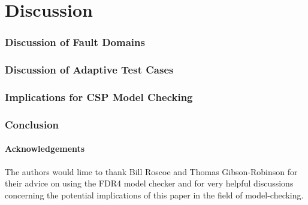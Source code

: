 \section{Discussion}
\label{sec:conc}
\subsubsection*{Discussion of Fault Domains}

\subsubsection*{Discussion of Adaptive Test Cases}

\subsubsection*{Implications for CSP Model Checking}

\subsubsection*{Conclusion}


\paragraph{Acknowledgements}
The authors would lime to thank Bill Roscoe and Thomas Gibson-Robinson for their advice on using the FDR4 model checker and for very helpful discussions concerning the potential implications of this paper in the field of model-checking.
